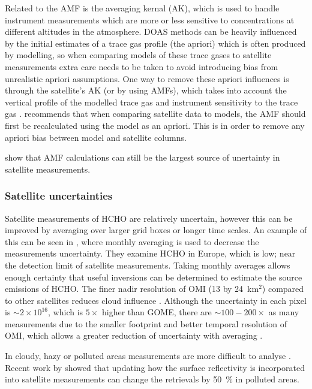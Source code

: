       Related to the AMF is the averaging kernal (AK), which is used to handle instrument measurements which are more or less sensitive to concentrations at different altitudes in the atmosphere.
      DOAS methods can be heavily influenced by the initial estimates of a trace gas profile (the apriori) which is often produced by modelling, so when comparing models of these trace gases to satellite measurements extra care needs to be taken to avoid introducing bias from unrealistic apriori assumptions.
      One way to remove these apriori influences is through the satellite's AK (or by using AMFs), which takes into account the vertical profile of the modelled trace gas and instrument sensitivity to the trace gas \citep{Eskes2003, Palmer2001}.
      \cite{Lamsal2014} recommends that when comparing satellite data to models, the AMF should first be recalculated using the model as an apriori.
      This is in order to remove any apriori bias between model and satellite columns.
      
      \citet{Lorente2017} show that AMF calculations can still be the largest source of unertainty in satellite measurements.
    
    \subsubsection{Satellite uncertainties}
      Satellite measurements of HCHO are relatively uncertain, however this can be improved by averaging over larger grid boxes or longer time scales.
      An example of this can be seen in \citet{Dufour2009}, where monthly averaging is used to decrease the measurements uncertainty.
      They examine HCHO in Europe, which is low; near the detection limit of satellite measurements.
      Taking monthly averages allows enough certainty that useful inversions can be determined to estimate the source emissions of HCHO.
      The finer nadir resolution of OMI (13 by 24~km${^2}$) compared to other satellites reduces cloud influence \citep{Millet2006, Millet2008}. 
      Although the uncertainty in each pixel is $\sim 2 \times 10^{16}$, which is $5 \times$ higher than GOME, there are $\sim 100-200 \times $ as many measurements due to the smaller footprint and better temporal resolution of OMI, which allows a greater reduction of uncertainty with averaging \citep{Chance2002,Millet2008}.
      
      In cloudy, hazy or polluted areas measurements are more difficult to analyse \citep[e.g.][]{Palmer2003,Marais2014}.
      Recent work by \cite{Vasilkov2017} showed that updating how the surface reflectivity is incorporated into satellite measurements can change the retrievals by 50~\% in polluted areas.
      
